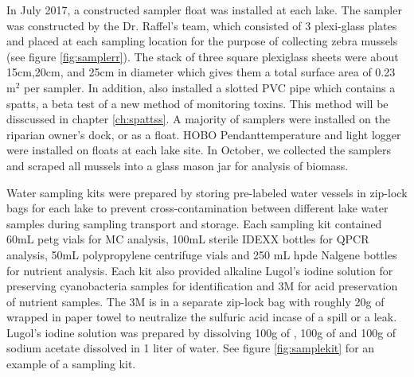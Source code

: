 In July 2017, a constructed sampler float was installed at each lake. The sampler was constructed by the Dr. Raffel's team, which consisted of 3 plexi-glass plates and placed at each sampling location for the purpose of collecting zebra mussels (see figure \ref{fig:samplerr}). The stack of three square plexiglass sheets were about 15cm,20cm, and 25cm in diameter which gives them a total surface area of 0.23 m$^2$ per sampler. In addition, also installed a slotted PVC pipe which contains a \gls{spatts}, a beta test of a new method of monitoring toxins. This method will be disscussed in chapter \ref{ch:spattss}. A majority of samplers were installed on the riparian owner's dock, or as a float. HOBO Pendant\texttrademark temperature and light logger were installed on floats at each lake site. In October, we collected the samplers and scraped all mussels into a glass mason jar for analysis of biomass.

Water sampling kits were prepared by storing pre-labeled water vessels in zip-lock bags for each lake to prevent cross-contamination between different lake water samples during sampling transport and storage. Each sampling kit contained 60mL \gls{petg} vials for MC analysis, 100mL sterile IDEXX bottles for QPCR analysis, 50mL polypropylene centrifuge vials and 250 mL \gls{hpde} Nalgene bottles for nutrient analysis. Each kit also provided alkaline Lugol's iodine solution for preserving cyanobacteria samples for identification and 3M  for acid preservation of nutrient samples. The 3M  is in a separate zip-lock bag with roughly 20g of  wrapped in paper towel to neutralize the sulfuric acid incase of a spill or a leak. Lugol's iodine solution was prepared by dissolving 100g of , 100g of  and 100g of sodium acetate dissolved in 1 liter of water. See figure \ref{fig:samplekit} for an example of a sampling kit.

